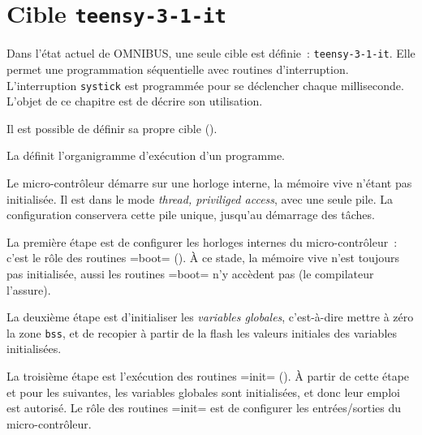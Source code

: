 




\chapter{Cible \texttt{teensy-3-1-it}}

Dans l'état actuel de OMNIBUS, une seule cible est définie~: \texttt{teensy-3-1-it}.  Elle permet une programmation séquentielle avec routines d'interruption. L'interruption \texttt{systick} est programmée pour se déclencher chaque milliseconde. L'objet de ce chapitre est de décrire son utilisation.

Il est possible de définir sa propre cible ().





















La  définit l'organigramme d'exécution d'un programme.

Le micro-contrôleur démarre sur une horloge interne, la mémoire vive n'étant pas initialisée. Il est dans le mode \emph{thread, priviliged access}, avec une seule pile. La configuration conservera cette pile unique, jusqu'au démarrage des tâches.

La première étape est de configurer les horloges internes du micro-contrôleur~: c'est le rôle des routines \omnibus=boot= (). À ce stade, la mémoire vive n'est toujours pas initialisée, aussi les routines \omnibus=boot= n'y accèdent pas (le compilateur l'assure).

La deuxième étape est d'initialiser les \emph{variables globales}, c'est-à-dire mettre à zéro la zone \texttt{bss}, et de recopier à partir de la flash les valeurs initiales des variables initialisées.

La troisième étape est l'exécution des routines \omnibus=init= (). À partir de cette étape et pour les suivantes, les variables globales sont initialisées, et donc leur emploi est autorisé. Le rôle des routines \omnibus=init= est de configurer les entrées/sorties du micro-contrôleur.

